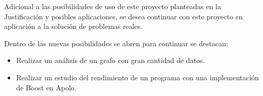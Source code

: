 Adicional a las posibilidades de uso de este proyecto planteadas en la Justificación y posibles aplicaciones, se desea continuar con este proyecto en aplicación a la solución de problemas reales. 

Dentro de las nuevas posibilidades se abren para continuar se destacan: 

\begin{itemize}
	\item Realizar un análisis de un grafo con gran cantidad de datos.
	\item Realizar un estudio del rendimiento de un programa con una implementación de Boost en Apolo.
\end{itemize}